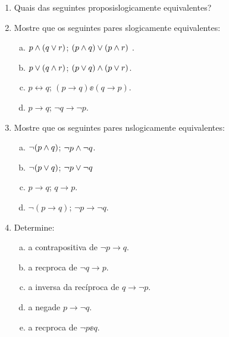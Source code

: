 \begin{enumerate}[{\bf 1.}]
\item Quais das seguintes proposi\coes s\ao logicamente equivalentes?
\begin{enumerate}[a)]
\end{enumerate}

\item Mostre que os seguintes pares s\ao logicamente equivalentes:
\begin{enumerate}[a)]
\item $p\wedge(q\vee r)$; $(p\wedge q)\vee(p\wedge r)$ .
\item $p\vee(q\wedge r)$; $(p\vee q)\wedge(p\vee r)$.
\item $p\leftrightarrow q$; $(p \to q)\ee(q \to p)$.
\item $p \to q$; $\lnot q \to \lnot p$.
\end{enumerate}

\item Mostre que os seguintes pares n\ao s\ao logicamente equivalentes:
\begin{enumerate}[a)]
\item $\lnot(p \wedge q)$; $\lnot p \wedge \lnot q$.
\item $\lnot(p \vee q)$; $\lnot p \vee \lnot q$
\item $p \to q$; $q \to p$.
\item $\lnot (p \to q)$; $\lnot p \to \lnot q$.
\end{enumerate}

\item Determine:
\begin{enumerate}[a)]
\item a contrapositiva de $\lnot p\to q$.
\item a rec\ih proca de $\lnot q \to p$.
\item a inversa da recíproca de $q \to \lnot p$.
\item a nega\cao de $p \to \lnot q$.
\item a rec\ih proca de $\lnot p \ee q$.
\end{enumerate}


\end{enumerate}
